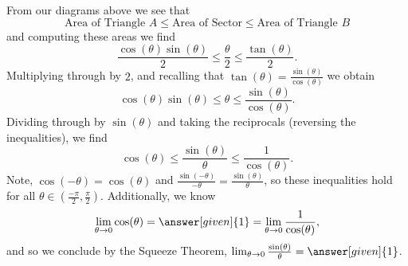 \documentclass{ximera}
\begin{document}
\begin{example}
\begin{explanation}
From our diagrams above we see that
\[
\text{Area of Triangle $A$} \le \text{Area of Sector} \le \text{Area of Triangle $B$}
\]
and computing these areas we find
\[
\frac{\cos(\theta)\sin(\theta)}{2} \le \frac{\theta}{2} \le \frac{\tan(\theta)}{2}.
\]
Multiplying through by $2$, and recalling that $\tan(\theta) =
\frac{\sin(\theta)}{\cos(\theta)}$ we obtain
\[
\cos(\theta)\sin(\theta) \le \theta \le \frac{\sin(\theta)}{\cos(\theta)}.
\]
Dividing through by $\sin(\theta)$ and taking the reciprocals
(reversing the inequalities), we find
\[
\cos(\theta) \le \frac{\sin(\theta)}{\theta} \le \frac{1}{\cos(\theta)}.
\]
Note, $\cos(-\theta) = \cos(\theta)$ and $\frac{\sin(-\theta)}{-\theta} =
\frac{\sin(\theta)}{\theta}$, so these inequalities hold for all $\theta\in
\left(\frac{-\pi}{2}, \frac{\pi}{2}\right)$.  Additionally, we know
\[
\lim_{\theta \to 0}\cos(\theta) = \answer[given]{1} = \lim_{\theta\to 0}\frac{1}{\cos(\theta)},
\]
and so we conclude by the Squeeze Theorem, $\lim_{\theta \to
  0}\frac{\sin(\theta)}{\theta} = \answer[given]{1}$.
\end{explanation}
\end{example}

\end{document}
